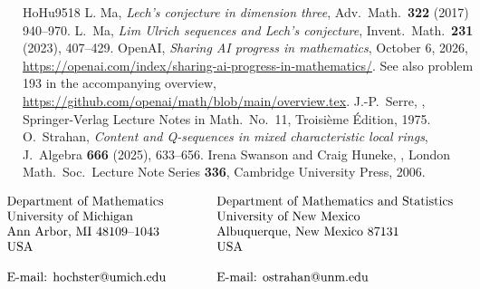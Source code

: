 \documentclass[12pt]{amsart}
\theoremstyle{plain}
\theoremstyle{remark}
\theoremstyle{definition}
\numberwithin{equation}{theorem}
\begin{document}
\begin{thebibliography}{HoHu9518}
 L. Ma, \emph{Lech's conjecture in dimension three}, Adv.~Math.~{\bf 322} (2017) 
940--970. %
 L.~Ma, \emph{Lim Ulrich sequences and Lech's conjecture}, Invent.~Math.~{\bf 231} (2023), 407--429.  %
 OpenAI, \emph{Sharing AI progress in mathematics},
October 6, 2026, \url{https://openai.com/index/sharing-ai-progress-in-mathematics/}.
See also problem 193 in the accompanying overview,
\url{https://github.com/openai/math/blob/main/overview.tex}.
 J.-P.~Serre, , Springer-Verlag Lecture Notes in Math.~No.~11, Troisi\`eme \'Edition, 1975.
 O.~Strahan, \emph{Content and Q-sequences in mixed
characteristic local rings}, J.~Algebra {\bf 666} (2025), 633--656.
 Irena Swanson and Craig Huneke, , 
London Math.~Soc.~Lecture Note Series {\bf 336}, Cambridge University Press, 2006.




\end{thebibliography}
\quad\bigskip

\quad\bigskip


$\begin{array}{ll}
\hspace*{-18pt} \textrm{Department of Mathematics}&\qquad\quad \textrm{Department of Mathematics and Statistics}\\
\hspace*{-18pt}\textrm{University of Michigan}   &\qquad\quad\textrm{University of New Mexico}\\
\hspace*{-18pt}\textrm{Ann Arbor, MI 48109--1043}      &\quad\qquad \textrm{Albuquerque, New Mexico 87131}\\
\hspace*{-18pt}\textrm{USA}                            &\quad\qquad \textrm{USA}\\
\hspace*{-18pt}\quad & \quad\\
\hspace*{-18pt}\textrm{E-mail: hochster@umich.edu}     &\qquad\quad \textrm{E-mail: ostrahan@unm.edu}\\ 
 
\end{array}$
\end{document}
